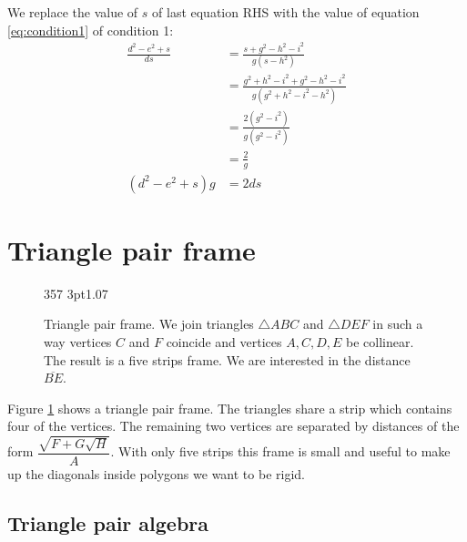 \documentclass[11pt]{article}
\begin{document}
We replace the value of $s$ of last equation RHS with the value of equation \ref{eq:condition1}
of condition 1:
\begin{align}
\frac{d^2 - e^2 + s}{ds} &= \frac{s + g^2 - h^2 - i^2}{g(s-h^2)} \nonumber\\
 &= \frac{g^2 + h^2 - i^2 + g^2 - h^2 - i^2}{g(g^2 + h^2 - i^2-h^2)} \nonumber\\
 &= \frac{2(g^2 - i^2)}{g(g^2 - i^2)} \nonumber\\
 &= \frac{2}{g} \nonumber\\
(d^2 - e^2 + s)g &= 2ds \label{eq:condition2}
\end{align}




\section{Triangle pair frame}

\begin{figure}[H]
\centering
\begin{center}
 {3}{5}{7} {3pt}{1.0}{7}
\end{center}
\caption{Triangle pair frame.
We join triangles $\triangle{ABC}$ and $\triangle{DEF}$ in such a way vertices $C$ and $F$ coincide
and vertices $A,C,D,E$ be collinear. The result is a five strips frame. We are interested in the
distance $\overline{BE}$.}
\label{fig:tripair}
\end{figure}

Figure \ref{fig:tripair} shows a triangle pair frame. The triangles share a strip which contains four of the vertices.
The remaining two vertices are separated by distances of the form $\dfrac{\sqrt{F+G\sqrt{H}}}A$. With only five strips this frame is small and useful to make up the diagonals inside polygons we want to be rigid.

\subsection{Triangle pair algebra}
\end{document}
